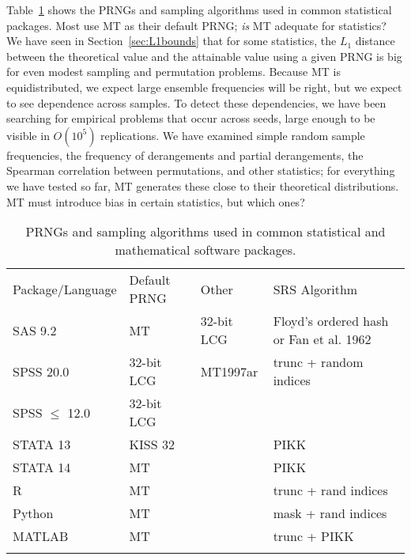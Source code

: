 \documentclass[graybox]{svmult}
\begin{document}
Table~\ref{tab:software} shows the PRNGs and sampling algorithms used in common statistical packages.
Most use MT as their default PRNG; \emph{is} MT adequate for statistics?
We have seen in Section~\ref{sec:L1bounds} that for some statistics, the $L_1$ distance between the theoretical value and the attainable value using a given PRNG
 is big for even modest sampling and permutation problems.
Because MT is equidistributed, we expect large ensemble frequencies will be right, but we expect to see dependence across samples.
To detect these dependencies, we have been searching for empirical problems that occur across seeds, large enough to be visible in $O(10^5)$ replications.
We have examined simple random sample frequencies, the frequency of derangements and partial derangements, the Spearman correlation between permutations, 
and other statistics;
for everything we have tested so far, MT generates these close to their theoretical distributions.
MT must introduce bias in certain statistics, but which ones?

\begin{table}
\caption{PRNGs and sampling algorithms used in common statistical and mathematical software packages.}
\label{tab:software}      
\begin{tabular}[h]{p{2.5cm}p{2.4cm}p{2.5cm}p{4cm}}
\hline\noalign{\smallskip}
Package/Language & Default PRNG & Other & SRS Algorithm  \\
\noalign{\smallskip}\svhline\noalign{\smallskip}
SAS 9.2              & MT         	& 32-bit LCG & Floyd's ordered hash or Fan et al. 1962 \\
SPSS 20.0          & 32-bit LCG  & MT1997ar  & trunc + random indices \\
SPSS $\le$ 12.0 & 32-bit LCG  &         &                \\
STATA 13            & KISS 32      &         & PIKK           \\
STATA 14            & MT              &         & PIKK           \\
R                         & MT              &         & trunc + rand indices \\
Python                 & MT             &         & mask + rand indices  \\
MATLAB              & MT             &         & trunc + PIKK         \\
\noalign{\smallskip}\hline\noalign{\smallskip}
\end{tabular}
\end{table}
\end{document}
